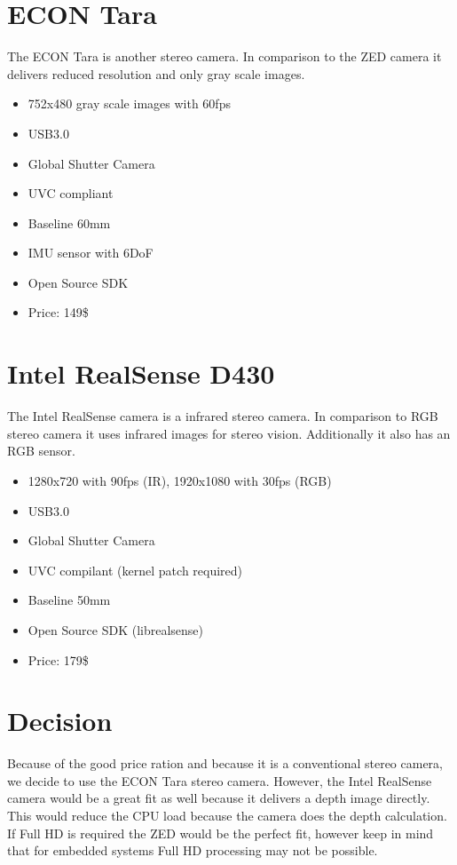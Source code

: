 \documentclass[11pt,a4paper,titlepage,oneside]{report}
\begin{document}
\section{ECON Tara}
The ECON Tara is another stereo camera. In comparison to the ZED camera it delivers reduced resolution and only gray scale images.
\begin{itemize}
	\item 752x480 gray scale images with 60fps
	\item USB3.0
	\item Global Shutter Camera
	\item UVC compliant
	\item Baseline 60mm
	\item IMU sensor with 6DoF
	\item Open Source SDK
	\item Price: 149\$
\end{itemize}

\section{Intel RealSense D430}
The Intel RealSense camera is a infrared stereo camera. In comparison to RGB stereo camera it uses infrared images for stereo vision. Additionally it also has an RGB sensor.
\begin{itemize}
	\item 1280x720 with 90fps (IR), 1920x1080 with 30fps (RGB)
	\item USB3.0
	\item Global Shutter Camera
	\item UVC compilant (kernel patch required)
	\item Baseline 50mm
	\item Open Source SDK (librealsense)
	\item Price: 179\$
\end{itemize}

\section{Decision}

Because of the good price ration and because it is a conventional stereo camera, we decide to use the ECON Tara stereo camera. However, the Intel RealSense camera would be a great fit as well because it delivers a depth image directly. This would reduce the CPU load because the camera does the depth calculation. If Full HD is required the ZED would be the perfect fit, however keep in mind that for embedded systems Full HD processing may not be possible.
\end{document}
